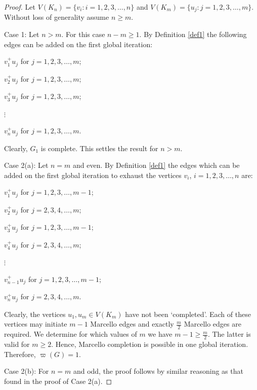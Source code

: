 \documentclass[10pt,a4paper]{amsart}
\begin{document}
\begin{proof}
Let $V(K_n) = \{v_i: i = 1,2,3,\dots,n\}$ and $V(K_m) = \{u_j:j = 1,2,3,\dots,m\}$. Without loss of generality assume $n \geq m$.

Case 1: Let $n > m$. For this case $n-m \geq 1$. By Definition \ref{def1} the following edges can be added on the first global iteration:
\begin{center}
$v^+_1u_j$ for $j = 1,2,3,\dots,m$;

$v^+_2u_j$ for $j = 1,2,3,\dots,m$;

$v^+_3u_j$ for $j = 1,2,3,\dots,m$;

$\vdots$

$v^+_nu_j$ for $j = 1,2,3,\dots,m$.
\end{center}
Clearly, $G_1$ is complete. This settles the result for $n > m$.

Case 2(a): Let $n = m$ and even. By Definition \ref{def1} the edges which can be added on the first global iteration to exhaust the vertices $v_i$, $ i = 1,2,3,\dots,n$ are: 
\begin{center}
$v^+_1u_j$ for $j = 1,2,3,\dots,m-1$;

$v^+_2u_j$ for $j = 2,3,4,\dots,m$;

$v^+_3u_j$ for $j = 1,2,3,\dots,m-1$;

$v^+_4u_j$ for $j = 2,3,4,\dots,m$;

$\vdots$

$v^+_{n-1}u_j$ for $j = 1,2,3,\dots,m-1$;

$v^+_nu_j$ for $j = 2,3,4,\dots,m$.
\end{center}
Clearly, the vertices $u_1,u_m \in V(K_m)$ have not been \lq completed\rq. Each of these vertices may initiate $m-1$ Marcello edges and exactly $\frac{m}{2}$ Marcello edges are required. We determine for which values of $m$ we have $m-1 \geq \frac{m}{2}$. The latter is valid for $m \geq 2$. Hence, Marcello completion is possible in one global iteration. Therefore, $\varpi(G) = 1$.

Case 2(b): For $n = m$ and odd, the proof follows by similar reasoning as that found in the proof of Case 2(a).
\end{proof}
\end{document}
